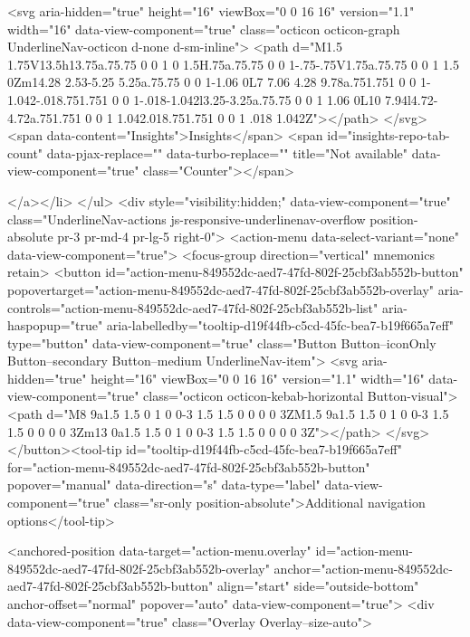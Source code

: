               <svg aria-hidden="true" height="16" viewBox="0 0 16 16" version="1.1" width="16" data-view-component="true" class="octicon octicon-graph UnderlineNav-octicon d-none d-sm-inline">
    <path d="M1.5 1.75V13.5h13.75a.75.75 0 0 1 0 1.5H.75a.75.75 0 0 1-.75-.75V1.75a.75.75 0 0 1 1.5 0Zm14.28 2.53-5.25 5.25a.75.75 0 0 1-1.06 0L7 7.06 4.28 9.78a.751.751 0 0 1-1.042-.018.751.751 0 0 1-.018-1.042l3.25-3.25a.75.75 0 0 1 1.06 0L10 7.94l4.72-4.72a.751.751 0 0 1 1.042.018.751.751 0 0 1 .018 1.042Z"></path>
</svg>
        <span data-content="Insights">Insights</span>
          <span id="insights-repo-tab-count" data-pjax-replace="" data-turbo-replace="" title="Not available" data-view-component="true" class="Counter"></span>


    
</a></li>
</ul>
    <div style="visibility:hidden;" data-view-component="true" class="UnderlineNav-actions js-responsive-underlinenav-overflow position-absolute pr-3 pr-md-4 pr-lg-5 right-0">      <action-menu data-select-variant="none" data-view-component="true">
  <focus-group direction="vertical" mnemonics retain>
    <button id="action-menu-849552dc-aed7-47fd-802f-25cbf3ab552b-button" popovertarget="action-menu-849552dc-aed7-47fd-802f-25cbf3ab552b-overlay" aria-controls="action-menu-849552dc-aed7-47fd-802f-25cbf3ab552b-list" aria-haspopup="true" aria-labelledby="tooltip-d19f44fb-c5cd-45fc-bea7-b19f665a7eff" type="button" data-view-component="true" class="Button Button--iconOnly Button--secondary Button--medium UnderlineNav-item">  <svg aria-hidden="true" height="16" viewBox="0 0 16 16" version="1.1" width="16" data-view-component="true" class="octicon octicon-kebab-horizontal Button-visual">
    <path d="M8 9a1.5 1.5 0 1 0 0-3 1.5 1.5 0 0 0 0 3ZM1.5 9a1.5 1.5 0 1 0 0-3 1.5 1.5 0 0 0 0 3Zm13 0a1.5 1.5 0 1 0 0-3 1.5 1.5 0 0 0 0 3Z"></path>
</svg>
</button><tool-tip id="tooltip-d19f44fb-c5cd-45fc-bea7-b19f665a7eff" for="action-menu-849552dc-aed7-47fd-802f-25cbf3ab552b-button" popover="manual" data-direction="s" data-type="label" data-view-component="true" class="sr-only position-absolute">Additional navigation options</tool-tip>


<anchored-position data-target="action-menu.overlay" id="action-menu-849552dc-aed7-47fd-802f-25cbf3ab552b-overlay" anchor="action-menu-849552dc-aed7-47fd-802f-25cbf3ab552b-button" align="start" side="outside-bottom" anchor-offset="normal" popover="auto" data-view-component="true">
  <div data-view-component="true" class="Overlay Overlay--size-auto">
    
